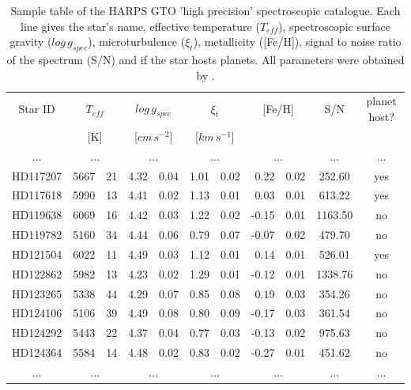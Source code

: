 \documentclass[dvips,12pt,a4paper]{report}
\begin{document}
{\begin{table}[h]
  \centering
\caption[Sample table of the HARPS GTO ``high precision'' spectroscopic catalogue.]{Sample table of the HARPS GTO 'high precision' spectroscopic catalogue. Each line gives the star's name, effective temperature ($T_{eff}$), spectroscopic surface gravity ($log\,g_{spec}$), microturbulence ($\xi_t$), metallicity ([Fe/H]), signal to noise ratio of the spectrum (S/N) and if the star hosts planets. All parameters were obtained by \citet{Sousa-2008}.}
  \label{cat_sample}
  \begin{tabular}{ c r@{$\pm$}l r@{$\pm$}l r@{$\pm$}l r@{$\pm$}l c c}
  \hline
  \hline
Star ID & \multicolumn {2}{c}{$T_{eff}$} & \multicolumn {2}{c}{$log\,g_{spec}$} & \multicolumn {2}{c}{$\xi_t$} & \multicolumn {2}{c}{[Fe/H]} & S/N & planet host? \\
& \multicolumn {2}{c}{[K]} & \multicolumn {2}{c}{[$cm\,s^{-2}$]} & \multicolumn {2}{c}{[$km\,s^{-1}$]} & \multicolumn {2}{c}{ } &  &  \\
\hline
... & \multicolumn {2}{c}{...} & \multicolumn {2}{c}{...} & \multicolumn {2}{c}{...} & \multicolumn {2}{c}{...} & ... & ... \\
HD117207 & 5667 & 21 & 4.32 & 0.04 & 1.01 & 0.02 & 0.22 & 0.02 & 252.60 & yes \\
HD117618 & 5990 & 13 & 4.41 & 0.02 & 1.13 & 0.01 & 0.03 & 0.01 & 613.22 & yes \\
HD119638 & 6069 & 16 & 4.42 & 0.03 & 1.22 & 0.02 & -0.15 & 0.01 & 1163.50 & no \\
HD119782 & 5160 & 34 & 4.44 & 0.06 & 0.79 & 0.07 & -0.07 & 0.02 & 479.70 & no \\
HD121504 & 6022 & 11 & 4.49 & 0.03 & 1.12 & 0.01 & 0.14 & 0.01 & 526.01 & yes \\
HD122862 & 5982 & 13 & 4.23 & 0.02 & 1.29 & 0.01 & -0.12 & 0.01 & 1338.76 & no \\
HD123265 & 5338 & 44 & 4.29 & 0.07 & 0.85 & 0.08 & 0.19 & 0.03 & 354.26 & no \\
HD124106 & 5106 & 39 & 4.49 & 0.08 & 0.80 & 0.09 & -0.17 & 0.03 & 361.54 & no \\
HD124292 & 5443 & 22 & 4.37 & 0.04 & 0.77 & 0.03 & -0.13 & 0.02 & 975.63 & no \\
HD124364 & 5584 & 14 & 4.48 & 0.02 & 0.83 & 0.02 & -0.27 & 0.01 & 451.62 & no \\
... & \multicolumn {2}{c}{...} & \multicolumn {2}{c}{...} & \multicolumn {2}{c}{...} & \multicolumn {2}{c}{...} & ... & ... \\
\hline
\end{tabular}
\end{table}

}
\end{document}

